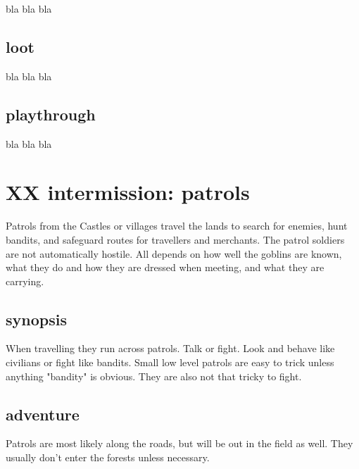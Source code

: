 bla bla bla


\subsection*{loot}

bla bla bla


\subsection*{playthrough}

bla bla bla










\newpage
\section*{XX intermission: patrols}


Patrols from the Castles or villages travel the lands to search for enemies, hunt bandits, and safeguard routes for travellers and merchants. The patrol soldiers are not automatically hostile. All depends on how well the goblins are known, what they do and how they are dressed when meeting, and what they are carrying.


\subsection*{synopsis}

When travelling they run across patrols. Talk or fight. Look and behave like civilians or fight like bandits. Small low level patrols are easy to trick unless anything "bandity" is obvious. They are also not that tricky to fight.


\subsection*{adventure}

Patrols are most likely along the roads, but will be out in the field as well. They usually don't enter the forests unless necessary.


